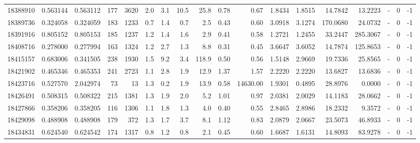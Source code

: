 \begin{tabular}{rrrrrrrrrrrrrrrlrr}
  18388910 & 0.563144 &   0.563112 &  177 & 3620 &      2.0 &      3.1 &    10.5 &     25.8 &       0.78 &        0.67 &  1.8434 &  1.8515 &   14.7842 &   13.2223 &             - &        0 &         -1 \\
  18389736 & 0.324058 &   0.324059 &  183 & 1233 &      0.7 &      1.4 &     0.7 &      2.5 &       0.43 &        0.60 &  3.0918 &  3.1274 &  170.0680 &   24.0732 &             - &        0 &         -1 \\
  18391916 & 0.805152 &   0.805153 &  185 & 1237 &      1.2 &      1.4 &     1.6 &      2.9 &       0.41 &        0.58 &  1.2721 &  1.2455 &   33.2447 &  285.3067 &             - &        0 &         -1 \\
  18408716 & 0.278000 &   0.277994 &  163 & 1324 &      1.2 &      2.7 &     1.3 &      8.8 &       0.31 &        0.45 &  3.6647 &  3.6052 &   14.7874 &  125.8653 &             - &        0 &         -1 \\
  18415157 & 0.683006 &   0.341505 &  238 & 1930 &      1.5 &      9.2 &     3.4 &    118.9 &       0.50 &        0.56 &  1.5148 &  2.9669 &   19.7336 &   25.8565 &             - &        0 &         -1 \\
  18421902 & 0.465346 &   0.465353 &  241 & 2723 &      1.1 &      2.8 &     1.9 &     12.9 &       1.37 &        1.57 &  2.2220 &  2.2220 &   13.6827 &   13.6836 &             - &        0 &         -1 \\
  18423716 & 0.527570 &   2.042974 &   73 &   13 &      1.3 &      0.2 &     1.9 &     13.9 &       0.58 &    14630.00 &  1.9301 &  0.4895 &   28.8976 &    0.0000 &             - &        0 &         -1 \\
  18426491 & 0.508315 &   0.508322 &  215 & 1381 &      1.3 &      1.9 &     2.0 &      5.2 &       1.01 &        0.97 &  2.0381 &  2.0029 &   14.1183 &   28.0662 &             - &        0 &         -1 \\
  18427866 & 0.358206 &   0.358205 &  116 & 1306 &      1.1 &      1.8 &     1.3 &      4.0 &       0.40 &        0.55 &  2.8465 &  2.8986 &   18.2332 &    9.3572 &             - &        0 &         -1 \\
  18429098 & 0.488908 &   0.488908 &  179 &  372 &      1.3 &      1.7 &     3.7 &      8.1 &       1.12 &        0.83 &  2.0879 &  2.0667 &   23.5073 &   46.8933 &             - &        0 &         -1 \\
  18434831 & 0.624540 &   0.624542 &  174 & 1317 &      0.8 &      1.2 &     0.8 &      2.1 &       0.45 &        0.60 &  1.6687 &  1.6131 &   14.8093 &   83.9278 &             - &        0 &         -1 \\

\end{tabular}
